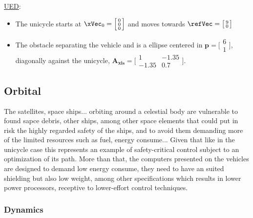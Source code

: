 \underline{UED}:
\label{ssssec:UED} %
\begin{itemize}
  \item The unicycle starts at \(\xVec_0 = \Bigl[\begin{smallmatrix} 0 \\ 0 \\ 0 \end{smallmatrix}\Bigr]\) and moves towards  \(\refVec = \bigl[\begin{smallmatrix} 9 \\ 0 \end{smallmatrix}\bigr]\)
  \item The obstacle separating the vehicle and \txtref is a ellipse centered in \(\mathbf{p} = \bigl[\begin{smallmatrix} 6 \\ 1 \end{smallmatrix}\bigr] \), diagonally against the unicycle, \(\mathbf{A_{xis}} = \bigl[\begin{smallmatrix} 1 & -1.35\\ -1.35 & 0.7\end{smallmatrix}\bigr]\).
\end{itemize}



\subsection{Orbital}
\label{subsec:orbital_simul_setup}

The satellites, space ships... orbiting around a celestial body are vulnerable to found sapce debris, other ships, among other space elements that could put in risk the highly regarded safety of the ships, and to avoid them demanding more of the limited resources such as fuel, energy consume... Given that like in the unicycle case this represents an example of safety-critical control subject to an optimization of its path.  More than that, the computers presented on the vehicles are designed to demand low energy consume, they need to have an suited shielding but also low weight, among other specifications which results in lower power processors, receptive to lower-effort control techniques.     


\subsubsection{Dynamics}
\label{subsubsec:orbital_dynamics}

